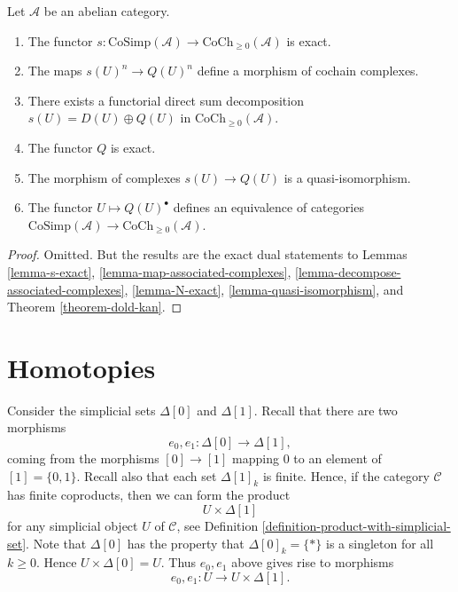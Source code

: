 \begin{lemma}
\label{lemma-dual-dold-kan}
Let $\mathcal{A}$ be an abelian category.
\begin{enumerate}
\item The functor
$s : \text{CoSimp}(\mathcal{A}) \to \text{CoCh}_{\geq 0}(\mathcal{A})$
is exact.
\item The maps $s(U)^n \to Q(U)^n$ define a morphism
of cochain complexes.
\item There exists a functorial direct sum decomposition
$s(U) = D(U) \oplus Q(U)$ in $\text{CoCh}_{\geq 0}(\mathcal{A})$.
\item The functor $Q$ is exact.
\item The morphism of complexes $s(U) \to Q(U)$ is a quasi-isomorphism.
\item The functor $U \mapsto Q(U)^\bullet$ defines
an equivalence of categories
$\text{CoSimp}(\mathcal{A}) \to \text{CoCh}_{\geq 0}(\mathcal{A})$.
\end{enumerate}
\end{lemma}

\begin{proof}
Omitted. But the results are the exact dual statements to
Lemmas \ref{lemma-s-exact}, \ref{lemma-map-associated-complexes},
\ref{lemma-decompose-associated-complexes},
\ref{lemma-N-exact}, \ref{lemma-quasi-isomorphism}, and
Theorem \ref{theorem-dold-kan}.
\end{proof}

\section{Homotopies}
\label{section-homotopy}

\noindent
Consider the simplicial sets $\Delta[0]$ and $\Delta[1]$.
Recall that there are two morphisms
$$
e_0, e_1 : \Delta[0] \longrightarrow \Delta[1],
$$
coming from the morphisms $[0] \to [1]$ mapping
$0$ to an element of $[1] = \{0, 1\}$. Recall also that each
set $\Delta[1]_k$ is finite. Hence, if the category
$\mathcal{C}$ has finite coproducts, then we can
form the product
$$
U \times \Delta[1]
$$
for any simplicial object $U$ of $\mathcal{C}$, see
Definition \ref{definition-product-with-simplicial-set}.
Note that $\Delta[0]$ has the property that $\Delta[0]_k = \{*\}$
is a singleton for all $k \geq 0$. Hence $U \times \Delta[0]
= U$. Thus $e_0, e_1$ above gives rise to morphisms
$$
e_0, e_1 : U \to U \times \Delta[1].
$$

